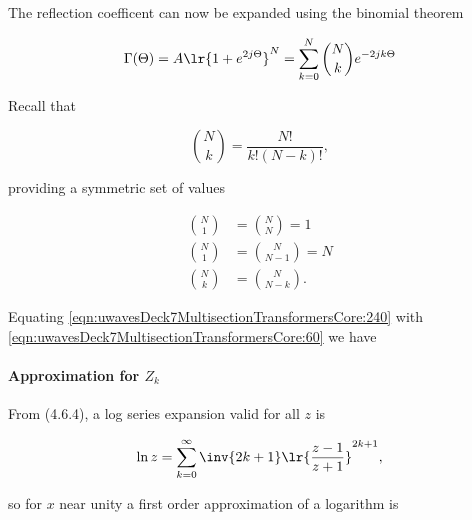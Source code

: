 
The reflection coefficent can now be expanded using the binomial theorem

\begin{dmath}\label{eqn:uwavesDeck7MultisectionTransformersCore:240}
\Gamma(\Theta) 
= A \lr{ 1 + e^{ 2 j \Theta } }^N
= \sum_{k = 0}^N \binom{N}{k} e^{ -2 j k \Theta}
\end{dmath}

Recall that 

\begin{equation}\label{eqn:uwavesDeck7MultisectionTransformersCore:260}
\binom{N}{k} = \frac{N!}{k! (N-k)!},
\end{equation}

providing a symmetric set of values

\begin{equation}\label{eqn:uwavesDeck7MultisectionTransformersCore:280}
\begin{aligned}
\binom{N}{1} &= \binom{N}{N} = 1 \\
\binom{N}{1} &= \binom{N}{N-1} = N \\
\binom{N}{k} &= \binom{N}{N-k}.
\end{aligned}
\end{equation}

Equating \cref{eqn:uwavesDeck7MultisectionTransformersCore:240} with \cref{eqn:uwavesDeck7MultisectionTransformersCore:60} we have


\paragraph{Approximation for \( Z_k \)}

From \citep{NIST:DLMF} (4.6.4), a log series expansion valid for all \( z \) is

\begin{equation}\label{eqn:uwavesDeck7MultisectionTransformersCore:320}
\ln z = \sum_{k = 0}^\infty \inv{2 k + 1} \lr{ \frac{ z - 1 }{z + 1} }^{2k + 1},
\end{equation}

so for \( x \) near unity a first order approximation of a logarithm is

